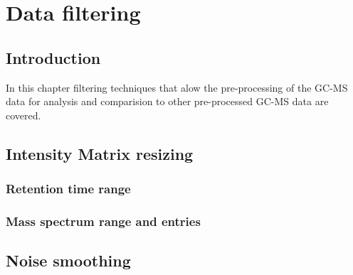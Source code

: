 

\chapter{Data filtering}

\section{Introduction}
In this chapter filtering techniques that alow the pre-processing of the
GC-MS data for analysis and comparision to other pre-processed GC-MS data are
covered.

\section{Intensity Matrix resizing}

\subsection{Retention time range}


\subsection{Mass spectrum range and entries}


\section{Noise smoothing}

